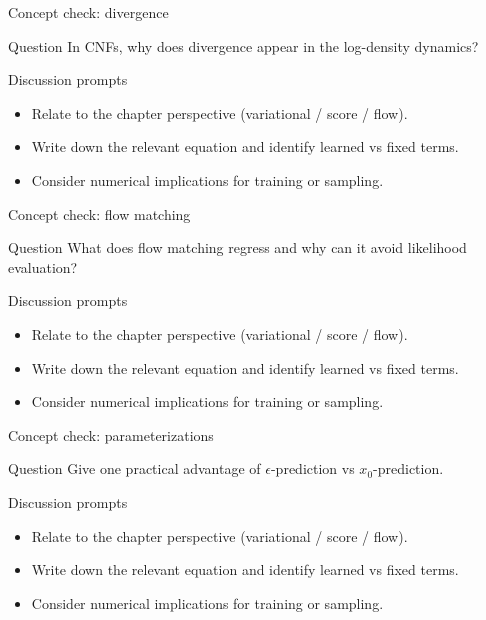 \documentclass[aspectratio=169]{beamer}
\begin{document}
\begin{frame}{Concept check: divergence}
\begin{block}{Question}
In CNFs, why does divergence appear in the log-density dynamics?
\end{block}
\begin{block}{Discussion prompts}
\begin{itemize}
\item Relate to the chapter perspective (variational / score / flow).
\item Write down the relevant equation and identify learned vs fixed terms.
\item Consider numerical implications for training or sampling.
\end{itemize}
\end{block}
\end{frame}

\begin{frame}{Concept check: flow matching}
\begin{block}{Question}
What does flow matching regress and why can it avoid likelihood evaluation?
\end{block}
\begin{block}{Discussion prompts}
\begin{itemize}
\item Relate to the chapter perspective (variational / score / flow).
\item Write down the relevant equation and identify learned vs fixed terms.
\item Consider numerical implications for training or sampling.
\end{itemize}
\end{block}
\end{frame}

\begin{frame}{Concept check: parameterizations}
\begin{block}{Question}
Give one practical advantage of \(\epsilon\)-prediction vs \(x_0\)-prediction.
\end{block}
\begin{block}{Discussion prompts}
\begin{itemize}
\item Relate to the chapter perspective (variational / score / flow).
\item Write down the relevant equation and identify learned vs fixed terms.
\item Consider numerical implications for training or sampling.
\end{itemize}
\end{block}
\end{frame}
\end{document}
